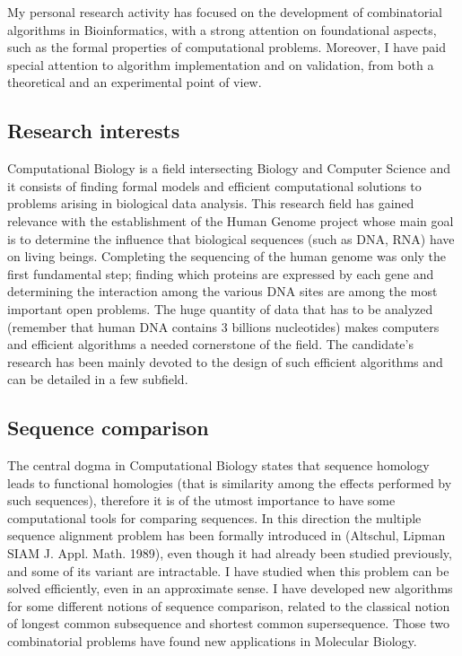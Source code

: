 \documentclass[11pt,a4paper,roman]{moderncv}
\begin{document}
My personal research activity has focused on the development of combinatorial algorithms in Bioinformatics, with a strong attention on foundational aspects, such as the formal properties of computational problems. Moreover, I have paid special attention to algorithm implementation and on validation, from both a theoretical and an experimental point of view.


\subsection{Research interests}

Computational Biology is a field intersecting Biology and Computer
Science and it consists of finding formal models and efficient
computational solutions to problems arising in biological data analysis.
This research field has gained relevance with the establishment of the
Human Genome project whose main goal is to determine the influence that
biological sequences (such as DNA, RNA) have on living beings.
Completing the sequencing of the human genome was only the first
fundamental step; finding which proteins are expressed by each gene and
determining the interaction among the various DNA sites are among the
most important open problems. The huge quantity of data that has to be
analyzed (remember that human DNA contains 3 billions nucleotides) makes
computers and efficient algorithms a needed cornerstone of the field.
The candidate's research has been mainly devoted to the design of such
efficient algorithms and can be detailed in a few subfield.

\subsection{Sequence comparison}\label{sequence-comparison}

The central dogma in Computational Biology states that sequence homology
leads to functional homologies (that is similarity among the effects
performed by such sequences), therefore it is of the utmost importance
to have some computational tools for comparing sequences. In this
direction the multiple sequence alignment problem has been formally
introduced in (Altschul, Lipman SIAM J. Appl. Math. 1989), even though
it had already been studied previously, and some of its variant are
intractable. I have studied when this problem can be solved efficiently,
even in an approximate sense. I have developed new algorithms for some
different notions of sequence comparison, related to the classical
notion of longest common subsequence and shortest common supersequence.
Those two combinatorial problems have found new applications in
Molecular Biology.
\end{document}
